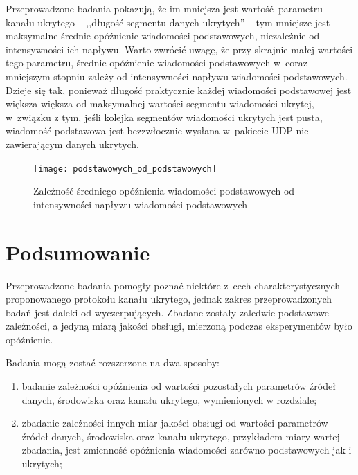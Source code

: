 \documentclass[a4paper, twoside, openright, 12pt]{report}
\begin{document}
            Przeprowadzone badania pokazują, że im mniejsza jest wartość parametru
            kanału ukrytego -- ,,długość segmentu danych ukrytych'' -- tym mniejsze
            jest maksymalne średnie opóźnienie wiadomości podstawowych, niezależnie
            od intensywności ich napływu. Warto zwrócić uwagę, że przy skrajnie małej wartości tego
            parametru, średnie opóźnienie wiadomości podstawowych w~coraz mniejszym stopniu
            zależy od intensywności napływu wiadomości podstawowych. Dzieje się tak, ponieważ długość praktycznie
            każdej wiadomości podstawowej jest większa większa od maksymalnej wartości
            segmentu wiadomości ukrytej, w~związku z tym, jeśli
            kolejka segmentów wiadomości ukrytych jest pusta, wiadomość podstawowa jest
            bezzwłocznie wysłana w~pakiecie UDP nie zawierającym danych ukrytych.

        \begin{figure}[h]
                \centering
                \texttt{[image: podstawowych\_od\_podstawowych]}
                \caption{Zależność średniego opóźnienia wiadomości podstawowych od
                    intensywności napływu wiadomości podstawowych}
                \label{OPOZNIENIEPODSTAWOWYCHODPODSTAWOWYCH}
        \end{figure}

        \section{Podsumowanie}
        Przeprowadzone badania pomogły poznać niektóre z~cech charakterystycznych
        proponowanego protokołu kanału ukrytego, jednak zakres przeprowadzonych badań
        jest daleki od wyczerpujących. Zbadane
        zostały zaledwie podstawowe zależności, a jedyną miarą jakości obsługi,
        mierzoną podczas eksperymentów było opóźnienie.

        Badania mogą zostać rozszerzone na dwa sposoby:
        \begin{enumerate}
            \item badanie zależności opóźnienia od wartości pozostałych parametrów źródeł
                danych, środowiska oraz kanału ukrytego, wymienionych w rozdziale;
            \item zbadanie zależności innych miar jakości obsługi od wartości parametrów
                źródeł danych, środowiska oraz kanału ukrytego, przykładem miary
                wartej zbadania, jest zmienność opóźnienia wiadomości zarówno
                podstawowych jak i ukrytych;
            \end{enumerate}
\end{document}
